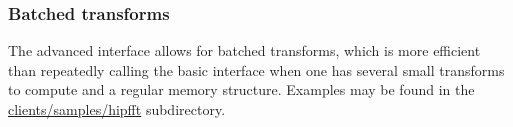\documentclass[10pt]{article}
\renewcommand{\(}{\left(}
\renewcommand{\)}{\right)}
\begin{document}
\subsubsection{Batched transforms}

The advanced interface allows for batched transforms, which is more
efficient than repeatedly calling the basic interface when one has
several small transforms to compute and a regular memory structure.
Examples may be found in the \url{clients/samples/hipfft}
subdirectory.
\end{document}
